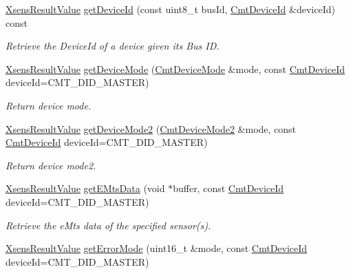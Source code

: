 \begin{DoxyCompactItemize}
\hyperlink{group__enums_ga822a2260a20af524029eef9e9a51ff6f}{\-Xsens\-Result\-Value} \hyperlink{classxsens_1_1Cmt3_abfbc806dd80f8883146931367a2cd290}{get\-Device\-Id} (const uint8\-\_\-t bus\-Id, \hyperlink{cmtdef_8h_a2e3b6a17360828d440ee848959918af2}{\-Cmt\-Device\-Id} \&device\-Id) const 
\begin{DoxyCompactList}\small\item\em \-Retrieve the \-Device\-Id of a device given its \-Bus \-I\-D. \end{DoxyCompactList}\item 
\hyperlink{group__enums_ga822a2260a20af524029eef9e9a51ff6f}{\-Xsens\-Result\-Value} \hyperlink{classxsens_1_1Cmt3_a6a0ca8b495be013695e8fceaf786ffe8}{get\-Device\-Mode} (\hyperlink{structCmtDeviceMode}{\-Cmt\-Device\-Mode} \&mode, const \hyperlink{cmtdef_8h_a2e3b6a17360828d440ee848959918af2}{\-Cmt\-Device\-Id} device\-Id=\-C\-M\-T\-\_\-\-D\-I\-D\-\_\-\-M\-A\-S\-T\-E\-R)
\begin{DoxyCompactList}\small\item\em \-Return device mode. \end{DoxyCompactList}\item 
\hyperlink{group__enums_ga822a2260a20af524029eef9e9a51ff6f}{\-Xsens\-Result\-Value} \hyperlink{classxsens_1_1Cmt3_a1c4ed1278ade6858bfbbc75b933e487d}{get\-Device\-Mode2} (\hyperlink{structCmtDeviceMode2}{\-Cmt\-Device\-Mode2} \&mode, const \hyperlink{cmtdef_8h_a2e3b6a17360828d440ee848959918af2}{\-Cmt\-Device\-Id} device\-Id=\-C\-M\-T\-\_\-\-D\-I\-D\-\_\-\-M\-A\-S\-T\-E\-R)
\begin{DoxyCompactList}\small\item\em \-Return device mode2. \end{DoxyCompactList}\item 
\hyperlink{group__enums_ga822a2260a20af524029eef9e9a51ff6f}{\-Xsens\-Result\-Value} \hyperlink{classxsens_1_1Cmt3_a0e6692f55902bcd10ff4b02aeeaf6148}{get\-E\-Mts\-Data} (void $\ast$buffer, const \hyperlink{cmtdef_8h_a2e3b6a17360828d440ee848959918af2}{\-Cmt\-Device\-Id} device\-Id=\-C\-M\-T\-\_\-\-D\-I\-D\-\_\-\-M\-A\-S\-T\-E\-R)
\begin{DoxyCompactList}\small\item\em \-Retrieve the e\-Mts data of the specified sensor(s). \end{DoxyCompactList}\item 
\hyperlink{group__enums_ga822a2260a20af524029eef9e9a51ff6f}{\-Xsens\-Result\-Value} \hyperlink{classxsens_1_1Cmt3_aaa6048289f7db91a061b41d4dfd0ad95}{get\-Error\-Mode} (uint16\-\_\-t \&mode, const \hyperlink{cmtdef_8h_a2e3b6a17360828d440ee848959918af2}{\-Cmt\-Device\-Id} device\-Id=\-C\-M\-T\-\_\-\-D\-I\-D\-\_\-\-M\-A\-S\-T\-E\-R)

\end{DoxyCompactItemize}
